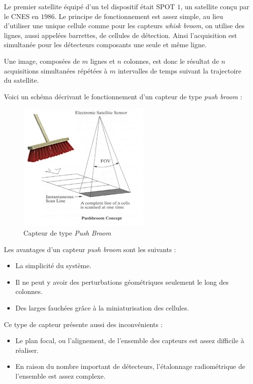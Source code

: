 \documentclass[a4paper, 11pt]{report}
\begin{document}
Le premier satellite équipé d'un tel dispositif était SPOT $1$, un satellite conçu par le CNES en $1986$.
Le principe de fonctionnement est assez simple, au lieu d'utiliser une unique cellule comme pour les capteurs \emph{whisk broom}, on utilise des lignes, aussi appelées barrettes, de cellules de détection.
Ainsi l'acquisition est simultanée pour les détecteurs composants une seule et même ligne.

Une image, composées de $m$ lignes et $n$ colonnes, est donc le résultat de $n$ acquisitions simultanées répétées à $m$ intervalles de temps suivant la trajectoire du satellite.

Voici un schéma décrivant le fonctionnement d'un capteur de type \emph{push broom} :
\begin{figure}[H]
	\begin{center}
		\includegraphics[scale=1.]{Images/Push_Broom.jpg}
		\caption{Capteur de type \emph{Push Broom}}
	\end{center}
\end{figure}
Les avantages d'un capteur \emph{push broom} sont les suivants :
\begin{itemize}
	\item La simplicité du système.
	\item Il ne peut y avoir des perturbations géométriques seulement le long des colonnes.
	\item Des larges fauchées grâce à la miniaturisation des cellules.
\end{itemize}
Ce type de capteur présente aussi des inconvénients :
\begin{itemize}
	\item Le plan focal, ou l'alignement, de l'ensemble des capteurs est assez difficile à réaliser.
	\item En raison du nombre important de détecteurs, l'étalonnage radiométrique de l'ensemble est assez complexe.
\end{itemize}
\end{document}
